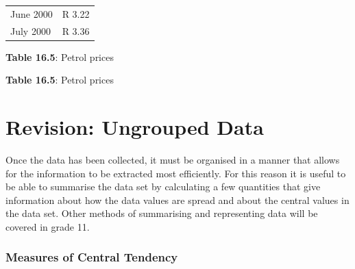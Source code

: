 \begin{description}[noitemsep]
\begin{description}[noitemsep]
\begin{table}
\begin{center}
\begin{xtabular}[t]{|l|l|}
        June 2000 &
        R 3.22%
     \tabularnewline{}
        July 2000 &
        R 3.36%
     \tabularnewline{}
    \end{xtabular}
      \end{center}
    \begin{center}{\small\bfseries Table 16.5}: Petrol prices\end{center}
    \begin{caption}{\small\bfseries Table 16.5}: Petrol prices\end{caption}
\end{table}
    \par
    \label{m39403*cid5}
% 
%     
%     
%     
%     
    \label{m39400*cid7}
            \section{Revision: Ungrouped Data}
            \nopagebreak
      \label{m39400*id211153}Once the data has been collected, it must be organised in a manner that allows for the information to be extracted most efficiently. For this reason it is useful to be able to summarise the data set by calculating a few quantities that give information about how the data values are spread and about the central values in the data set. Other methods of summarising and representing data will be covered in grade 11.\par 
      \label{m39400*uid59}
            \subsubsection{ Measures of Central Tendency}
            \nopagebreak
        \label{m39400*uid60}

\end{description}
\end{description}
